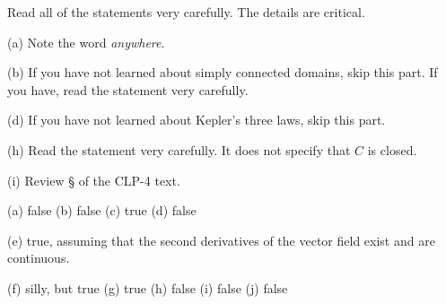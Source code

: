 \begin{hint} 
Read all of the statements very carefully. The details are critical.

(a) Note the word \emph{anywhere}.

(b) If you have not learned about simply connected domains,
skip this part. If you have, read the statement very carefully.

(d) If you have not learned about Kepler's three laws, skip this part.

(h) Read the statement very carefully. It does not specify that $C$ is closed.

(i) Review \S{} of the CLP-4 text.

\end{hint}

\begin{answer} 
(a) false \qquad
(b) false \qquad
(c) true \qquad
(d) false

(e) true, assuming that the second derivatives of the vector field exist 
and are continuous.

(f) silly, but true\qquad
(g) true\qquad
(h) false\qquad
(i) false\qquad
(j) false
\end{answer}

